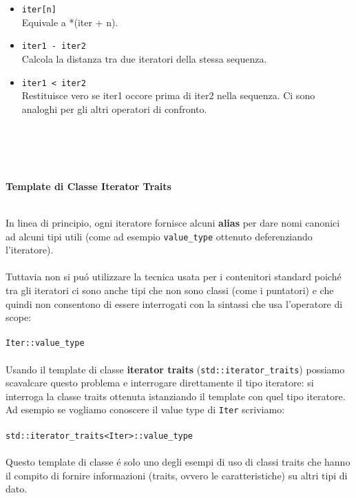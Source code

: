 \documentclass{article}
\begin{document}
\begin{itemize}
\begin{itemize}
\item \texttt{iter[n]}\\Equivale a *(iter + n).\\
\item \texttt{iter1 - iter2}\\Calcola la distanza tra due iteratori della stessa sequenza.\\
\item \texttt{iter1 < iter2}\\Restituisce vero se iter1 occore prima di iter2 nella sequenza. Ci sono analoghi per gli altri operatori di confronto.\\
\\ \\ \\ \\
\end{itemize}
\end{itemize}
\begin{large}\textbf{\textcolor{blu}{Template di Classe Iterator Traits}} \\ \\ \end{large}
In linea di principio, ogni iteratore fornisce alcuni \textbf{alias} per dare nomi canonici ad alcuni tipi utili (come ad esempio \texttt{value\_type} ottenuto deferenziando l'iteratore).\\ \\Tuttavia non si pu\'o utilizzare la tecnica usata per i contenitori standard poich\'e tra gli iteratori ci sono anche tipi che non sono classi (come i puntatori) e che quindi non consentono di essere interrogati con la sintassi che usa l'operatore di scope: \\ \\ \texttt{Iter::value\_type} \\ \\
Usando il template di classe \textbf{iterator traits} (\texttt{std::iterator\_traits}) possiamo scavalcare questo problema e interrogare direttamente il tipo iteratore: si interroga la classe traits ottenuta istanziando il template con quel tipo iteratore.\\Ad esempio se vogliamo conoscere il value type di \texttt{Iter} scriviamo: \\ \\
\texttt{std::iterator\_traits<Iter>::value\_type} \\ \\Questo template di classe \'e solo uno degli esempi di uso di classi traits che hanno il compito di fornire informazioni (traits, ovvero le caratteristiche) su altri tipi di dato.
\end{document}
